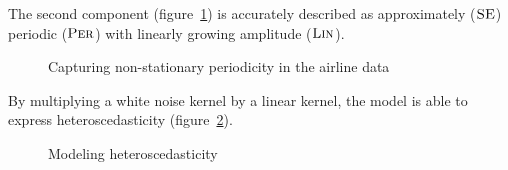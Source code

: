 \documentclass[letterpaper]{article}
\begin{document}
The second component (figure~\ref{fig:lin_periodic}) is accurately described as approximately (${\textsc{SE}}$) periodic (${\textsc{Per}}$) with linearly growing amplitude (${\textsc{Lin}}$).
%
\begin{figure}[h]
\centering
{}
\caption{Capturing non-stationary periodicity in the airline data}
\label{fig:lin_periodic}
\end{figure}
%
%
%
By multiplying a white noise kernel by a linear kernel, the model is able to express heteroscedasticity (figure~\ref{fig:heteroscedastic}).
%
\begin{figure}[h]
\centering
{}
\caption{Modeling heteroscedasticity}
\label{fig:heteroscedastic}
\end{figure}
\end{document}
